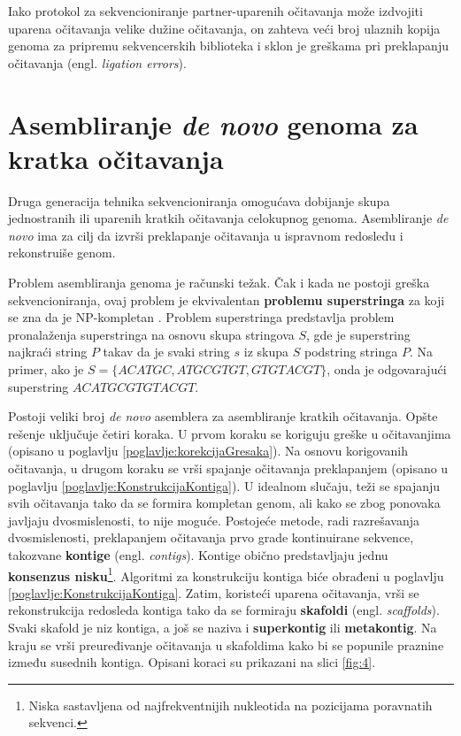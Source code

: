 \documentclass[12pt,oneside]{memoir}
\begin{document}
Iako protokol za sekvencioniranje partner-uparenih očitavanja može izdvojiti uparena očitavanja velike dužine očitavanja, on zahteva veći broj ulaznih kopija genoma za pripremu sekvencerskih biblioteka i sklon je greškama pri preklapanju očitavanja (engl. \textit{ligation errors}).
\begin{comment}
(ligation errors - greškama prilikom preklapanja očitavanja)
\end{comment}


\section{Asembliranje \textit{de novo} genoma za kratka očitavanja}

Druga generacija tehnika sekvencioniranja omogućava dobijanje skupa jednostranih ili uparenih kratkih očitavanja celokupnog genoma. Asembliranje \textit{de novo} ima za cilj da izvrši preklapanje očitavanja u ispravnom redosledu i rekonstruiše genom.

Problem asembliranja genoma je računski težak. Čak i kada ne postoji greška sekvencioniranja, ovaj problem je ekvivalentan \textbf{problemu superstringa} za koji se zna da je NP-kompletan \cite{NPcomplexity}. Problem superstringa predstavlja problem pronalaženja superstringa na osnovu skupa stringova $S$, gde je superstring najkraći string $P$ takav da je svaki string $s$ iz skupa $S$ podstring stringa $P$. Na primer, ako je $S = \{ACATGC, ATGCGTGT, GTGTACGT\}$, onda je odgovarajući superstring $ACATGCGTGTACGT$.

Postoji veliki broj \textit{de novo} asemblera za asembliranje kratkih očitavanja. Opšte rešenje uključuje četiri koraka. U prvom koraku se koriguju greške u očitavanjima (opisano u poglavlju \ref{poglavlje:korekcijaGresaka}). Na osnovu korigovanih očitavanja, u drugom koraku se vrši spajanje očitavanja preklapanjem (opisano u poglavlju \ref{poglavlje:KonstrukcijaKontiga}). U idealnom slučaju, teži se spajanju svih očitavanja tako da se formira kompletan genom, ali kako se zbog ponovaka javljaju dvosmislenosti, to nije moguće. Postojeće metode, radi razrešavanja dvosmislenosti, preklapanjem očitavanja prvo grade kontinuirane sekvence, takozvane \textbf{kontige} (engl. \textit{contigs}). Kontige obično predstavljaju jednu \textbf{konsenzus nisku}\footnote{Niska sastavljena od najfrekventnijih nukleotida na pozicijama poravnatih sekvenci.}. Algoritmi za konstrukciju kontiga biće obrađeni u poglavlju \ref{poglavlje:KonstrukcijaKontiga}. Zatim, koristeći uparena očitavanja, vrši se rekonstrukcija redosleda kontiga tako da se formiraju \textbf{skafoldi} (engl. \textit{scaffolds}). Svaki skafold je niz kontiga, a još se naziva i \textbf{superkontig} ili \textbf{metakontig}. Na kraju se vrši preuređivanje očitavanja u skafoldima kako bi se popunile praznine između susednih kontiga. Opisani koraci su prikazani na slici \ref{fig:4}.
\end{document}
